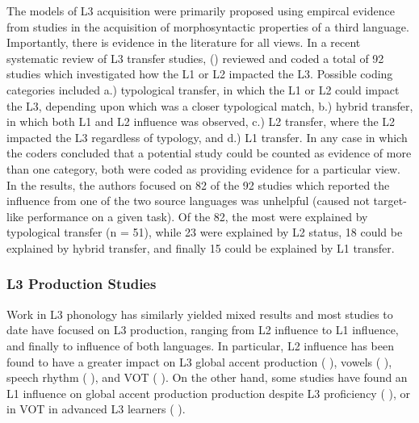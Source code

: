\documentclass[preprints]{Definitions/mdpi}
\begin{document}
The models of L3 acquisition were primarily proposed using empircal evidence from studies in the acquisition of morphosyntactic properties of a third language.
Importantly, there is evidence in the literature for all views.
In a recent systematic review of L3 transfer studies, \citeauthor{rothman_review_2019} (\citeyear{rothman_review_2019}) reviewed and coded a total of 92 studies which investigated how the L1 or L2 impacted the L3.
Possible coding categories included a.) typological transfer, in which the L1 or L2 could impact the L3, depending upon which was a closer typological match, b.) hybrid transfer, in which both L1 and L2 influence was observed, c.) L2 transfer, where the L2 impacted the L3 regardless of typology, and d.) L1 transfer.
In any case in which the coders concluded that a potential study could be counted as evidence of more than one category, both were coded as providing evidence for a particular view.
In the results, the authors focused on 82 of the 92 studies which reported the influence from one of the two source languages was unhelpful (caused not target-like performance on a given task).
Of the 82, the most were explained by typological transfer (n = 51), while 23 were explained by L2 status, 18 could be explained by hybrid transfer, and finally 15 could be explained by L1 transfer.

\hypertarget{l3-production-studies}{%
\subsubsection{L3 Production Studies}\label{l3-production-studies}}

Work in L3 phonology has similarly yielded mixed results and most studies to date have focused on L3 production, ranging from L2 influence to L1 influence, and finally to influence of both languages.
In particular, L2 influence has been found to have a greater impact on L3 global accent production (\citeauthor{wrembel_l2-accented_2010} \citeyear{wrembel_l2-accented_2010}), vowels (\citeauthor{kamiyama_acquisition_2007} \citeyear{kamiyama_acquisition_2007}), speech rhythm (\citeauthor{gut_cross-linguistic_2010} \citeyear{gut_cross-linguistic_2010}), and VOT (\citeauthor{llama_influence_2010} \citeyear{llama_influence_2010}).
On the other hand, some studies have found an L1 influence on global accent production production despite L3 proficiency (\citeauthor{cabrelli_amaro_foreign_2012} \citeyear{cabrelli_amaro_foreign_2012}), or in VOT in advanced L3 learners (\citeauthor{llama_revisiting_2018} \citeyear{llama_revisiting_2018}).
\end{document}

